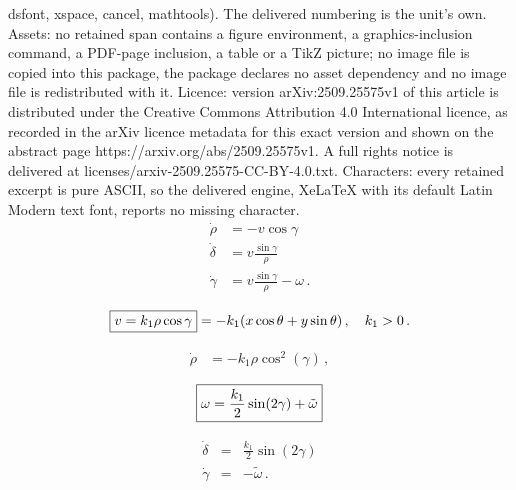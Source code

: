 \documentclass[10pt,a4paper]{amsart}
\begin{document}
dsfont, xspace, cancel, mathtools). The delivered numbering is the unit's own. Assets: no retained span contains a figure environment, a graphics-inclusion command, a PDF-page inclusion, a table or a TikZ picture; no image file is copied into this package, the package declares no asset dependency and no image file is redistributed with it. Licence: version arXiv:2509.25575v1 of this article is distributed under the Creative Commons Attribution 4.0 International licence, as recorded in the arXiv licence metadata for this exact version and shown on the abstract page https://arxiv.org/abs/2509.25575v1. A full rights notice is delivered at licenses/arxiv-2509.25575-CC-BY-4.0.txt. Characters: every retained excerpt is pure ASCII, so the delivered engine, XeLaTeX with its default Latin Modern text font, reports no missing character.
\begin{subequations}\label{eq:unicycle_polar_closed_loop-Gv-1}
    \begin{align}
    \dot{\rho} &= 
    -v \cos\gamma\label{eq:unicycle_polar_rhodot}\\
    \dot{\delta} &= v  \frac{\sin\gamma}{\rho}\label{eq:unicycle_polar_deltadot}\\
    \dot{\gamma} &= v \frac{\sin\gamma}{\rho} -\omega \label{eq:unicycle_polar_gammadot} \,.
    \end{align} 
\end{subequations}

\begin{equation}
\label{eq-basic-v-control}
\fbox{$v =  k_1 \rho \cos\gamma$} = -k_1(x\cos\theta+y\sin\theta)\,,  \quad k_1>0\,.
\end{equation}

\begin{align}
\label{eq:unicycle_polar_closed_loop-Gv-2}
\dot{\rho} &=  
- k_1 \rho \cos^2(\gamma)\,,
\end{align} 

\begin{equation}
\label{eq-omega-general}
\fbox{$\omega = \dfrac{k_1}{2} \sin(2\gamma) +\tilde\omega$}
\end{equation}

\begin{subequations}
\label{eq:unicycle_polar_closed_loop-Gv-3-pass}
\begin{eqnarray}
\label{eq:unicycle_polar_closed_loop-Gv-3n-pass}
\dot{\delta} &=&  \frac{k_1}{2} \sin(2\gamma)\\ \label{eq:unicycle_polar_closed_loop-Gv-3a-pass}
\dot{\gamma} &=& -\tilde\omega\,.
\end{eqnarray}
\end{subequations}
\end{document}
